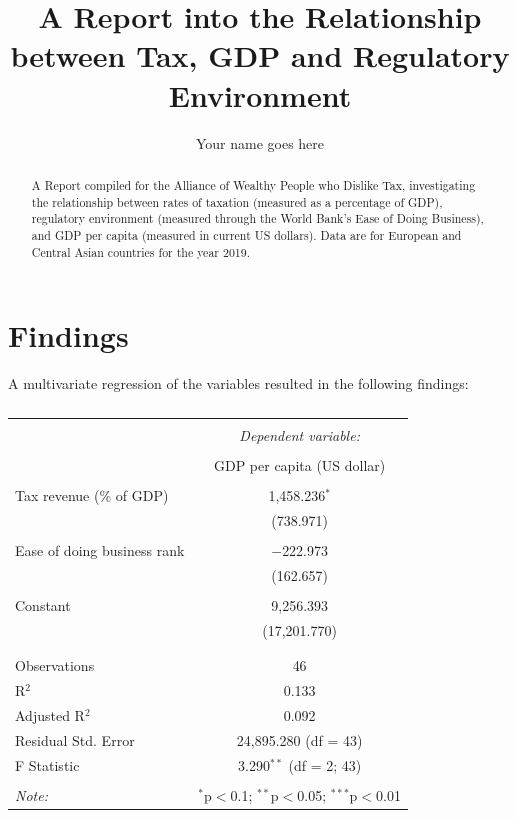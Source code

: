 \documentclass[]{report}
\title{A Report into the Relationship between Tax, GDP and Regulatory Environment}
\author{Your name goes here}
\begin{document}
\maketitle

\begin{abstract}
A Report compiled for the Alliance of Wealthy People who Dislike Tax, investigating the relationship between rates of taxation (measured as a percentage of GDP), regulatory environment (measured through the World Bank's Ease of Doing Business), and GDP per capita (measured in current US dollars). Data are for European and Central Asian countries for the year 2019.
\end{abstract}

\section{Findings}
A multivariate regression of the variables resulted in the following findings:

\begin{table}[!htbp] \centering 
	\caption{} 
	\label{} 
	\begin{tabular}{@{\extracolsep{5pt}}lc} 
		\\[-1.8ex]\hline 
		\hline \\[-1.8ex] 
		& \multicolumn{1}{c}{\textit{Dependent variable:}} \\ 
		\cline{2-2} 
		\\[-1.8ex] & GDP per capita (US dollar) \\ 
		\hline \\[-1.8ex] 
		Tax revenue (\% of GDP) & 1,458.236$^{*}$ \\ 
		& (738.971) \\ 
		& \\ 
		Ease of doing business rank & $-$222.973 \\ 
		& (162.657) \\ 
		& \\ 
		Constant & 9,256.393 \\ 
		& (17,201.770) \\ 
		& \\ 
		\hline \\[-1.8ex] 
		Observations & 46 \\ 
		R$^{2}$ & 0.133 \\ 
		Adjusted R$^{2}$ & 0.092 \\ 
		Residual Std. Error & 24,895.280 (df = 43) \\ 
		F Statistic & 3.290$^{**}$ (df = 2; 43) \\ 
		\hline 
		\hline \\[-1.8ex] 
		\textit{Note:}  & \multicolumn{1}{r}{$^{*}$p$<$0.1; $^{**}$p$<$0.05; $^{***}$p$<$0.01} \\ 
	\end{tabular} 
\end{table} 
\end{document}
